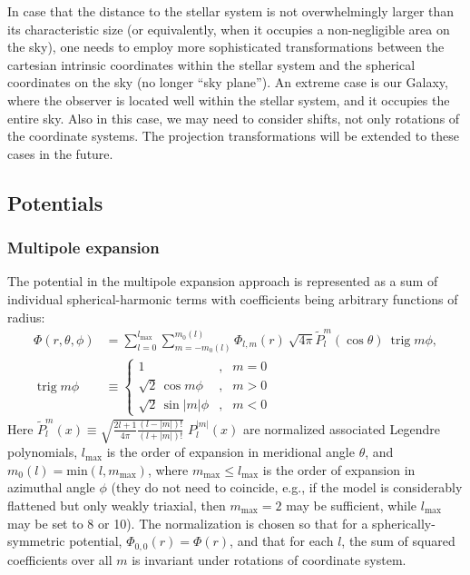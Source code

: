 \documentclass[12pt]{article}
\DeclareMathOperator{\trig}{trig}
\begin{document}
In case that the distance to the stellar system is not overwhelmingly larger than its characteristic size (or equivalently, when it occupies a non-negligible area on the sky), one needs to employ more sophisticated transformations between the cartesian intrinsic coordinates within the stellar system and the spherical coordinates on the sky (no longer ``sky plane''). An extreme case is our Galaxy, where the observer is located well within the stellar system, and it occupies the entire sky. Also in this case, we may need to consider shifts, not only rotations of the coordinate systems. The projection transformations will be extended to these cases in the future.


\subsection{Potentials}  \label{sec:PotentialDetails}


\subsubsection{Multipole expansion}  \label{sec:PotentialMultipoleDetails}

The potential in the multipole expansion approach is represented as a sum of individual spherical-harmonic terms with coefficients being arbitrary functions of radius:
\begin{align}
\Phi(r,\theta,\phi) &= \sum_{l=0}^{l_\mathrm{max}}\sum_{m=-m_0(l)}^{m_0(l)}
\Phi_{l,m}(r)\: \sqrt{4\pi} \tilde P_l^m(\cos\theta)\:\trig m\phi, \\
\trig m\phi &\equiv \left\{\begin{array}{rcl} 
  1 &,& m=0 \\
  \sqrt{2}\,\cos  m \phi &,& m > 0 \\
  \sqrt{2}\,\sin |m|\phi &,& m < 0 
\end{array}\right.   \nonumber
\end{align}
Here $\tilde P_l^m(x) \equiv \sqrt{\frac{2l+1}{4\pi}\frac{(l-|m|)!}{(l+|m|)!}} \;P_l^{|m|}(x)$ 
are normalized associated Legendre polynomials, $l_\mathrm{max}$ is the order of expansion in meridional angle $\theta$, and $m_0(l) = \mathrm{min}(l, m_\mathrm{max})$, where $m_\mathrm{max} \le l_\mathrm{max}$ is the order of expansion in azimuthal angle $\phi$ (they do not need to coincide, e.g., if the model is considerably flattened but only weakly triaxial, then $m_\mathrm{max}=2$ may be sufficient, while $l_\mathrm{max}$ may be set to 8 or 10). The normalization is chosen so that for a spherically-symmetric potential, $\Phi_{0,0}(r)=\Phi(r)$, and that for each $l$, the sum of squared coefficients over all $m$ is invariant under rotations of coordinate system.
\end{document}
